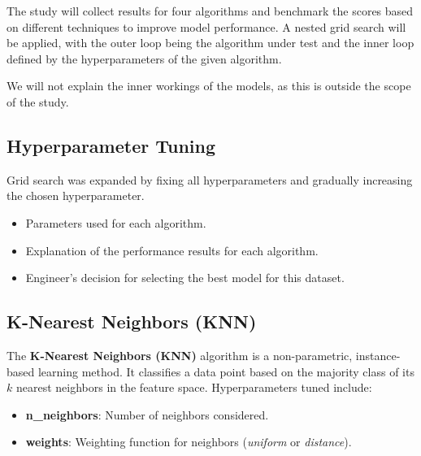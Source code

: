 \documentclass{article}
\begin{document}
The study will collect results for four algorithms and benchmark the scores based on different techniques
to improve model performance. A nested grid search will be applied, with the outer loop being the algorithm
under test and the inner loop defined by the hyperparameters of the given algorithm.

We will not explain the inner workings of the models, as this is outside the scope of the study.

\subsection{Hyperparameter Tuning}

Grid search was expanded by fixing all hyperparameters and gradually increasing the chosen hyperparameter.

\begin{itemize}
    \item Parameters used for each algorithm.
    \item Explanation of the performance results for each algorithm.
    \item Engineer's decision for selecting the best model for this dataset.
\end{itemize}

\subsection{K-Nearest Neighbors (KNN)}

The \textbf{K-Nearest Neighbors (KNN)} algorithm is a non-parametric, instance-based learning method.
It classifies a data point based on the majority class of its \(k\) nearest neighbors in the feature space.
Hyperparameters tuned include:
\begin{itemize}
    \item \textbf{n\_neighbors}: Number of neighbors considered.
    \item \textbf{weights}: Weighting function for neighbors (\textit{uniform} or \textit{distance}).
\end{itemize}
\end{document}

